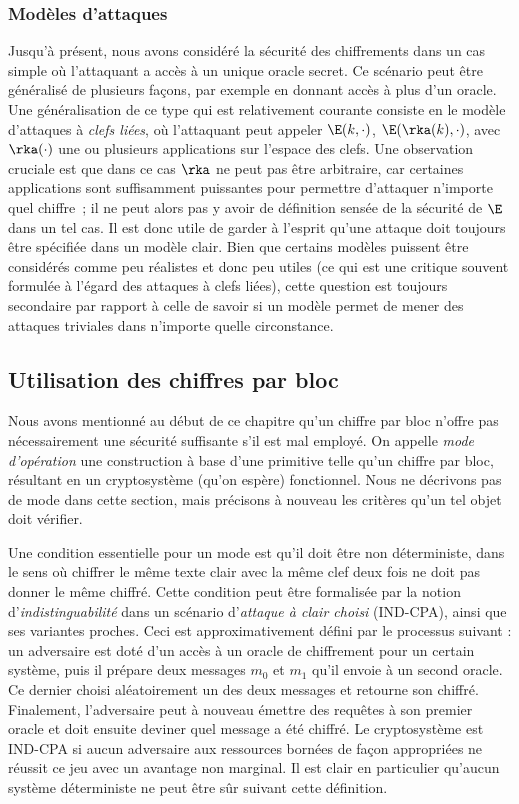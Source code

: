 \subsubsection{Modèles d'attaques}

Jusqu'à présent, nous avons considéré la sécurité des chiffrements dans un cas simple où l'attaquant a accès à un unique oracle secret.
Ce scénario peut être généralisé de plusieurs façons, par exemple en donnant accès à plus d'un oracle. Une généralisation de ce type qui est
relativement courante consiste en le modèle d'attaques à \emph{clefs liées}, où l'attaquant peut appeler
$\E(k,\cdot)$, $\E(\rka(k),\cdot)$, avec $\rka(\cdot)$ une ou plusieurs applications sur l'espace des clefs.
Une observation cruciale est que dans ce cas $\rka$ ne peut pas être arbitraire, car certaines applications sont suffisamment puissantes
pour permettre d'attaquer n'importe quel chiffre~; il ne peut alors pas y avoir de définition sensée de la sécurité de $\E$ dans un tel cas.
Il est donc utile de garder à l'esprit qu'une attaque doit toujours être spécifiée dans un modèle clair. Bien que certains modèles puissent
être considérés comme peu réalistes et donc peu utiles (ce qui est une critique souvent formulée à l'égard des attaques à clefs liées), cette
question est toujours secondaire par rapport à celle de savoir si un modèle permet de mener des attaques triviales dans n'importe quelle circonstance. 

\subsection{Utilisation des chiffres par bloc}
\label{sec:cf_modes}

Nous avons mentionné au début de ce chapitre qu'un chiffre par bloc n'offre pas nécessairement une sécurité suffisante s'il est mal employé.
On appelle \emph{mode d'opération} une construction à base d'une primitive telle qu'un chiffre par bloc, résultant en un cryptosystème (qu'on espère) fonctionnel.
Nous ne décrivons pas de mode dans cette section, mais précisons à nouveau les critères qu'un tel objet doit vérifier.

Une condition essentielle pour un mode est qu'il doit être non déterministe, dans le sens où chiffrer le même texte clair avec la même clef deux fois ne
doit pas donner le même chiffré. Cette condition peut être formalisée par la notion d'\emph{indistinguabilité} dans un scénario d'\emph{attaque à clair choisi}
(\textsf{IND-CPA}), ainsi que ses variantes proches. Ceci est approximativement défini par le processus suivant : un adversaire est doté d'un accès
à un oracle de chiffrement pour un certain système, puis il prépare deux messages $m_0$ et $m_1$ qu'il envoie à un second oracle. Ce dernier
choisi aléatoirement un des deux messages et retourne son chiffré. Finalement, l'adversaire peut à nouveau émettre des requêtes à son premier oracle et doit ensuite
deviner quel message a été chiffré. Le cryptosystème est \textsf{IND-CPA} si aucun adversaire aux ressources bornées de façon appropriées ne réussit ce jeu
avec un avantage non marginal. Il est clair en particulier qu'aucun système déterministe ne peut être sûr suivant cette définition. 


